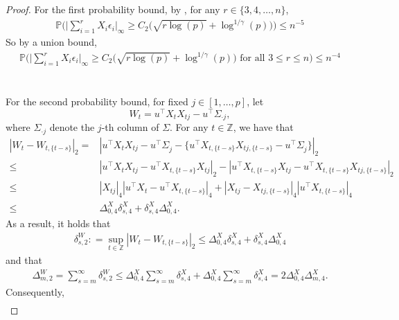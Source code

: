 \documentclass[11pt]{article}
\newcommand{\p}{\mathbb P}
\theoremstyle{plain}
\theoremstyle{definition}
\begin{document}
\begin{proof} For the first probability bound, by , for any $r\in\{3, 4, \ldots, n\}$,
\begin{align*} 
  \p\bigg(    \bigg  |   \sum_{i=1}^r X_i\epsilon_i   \bigg |_\infty \ge C_2  \bigg( \sqrt {  r \log(p )  }  +   \log ^{1/\gamma }(p )  \bigg)     \bigg)\le n^{-5} 
 \end{align*}    
So by a union bound, 
\begin{align*} 
  \p\bigg(    \bigg  |   \sum_{i=1}^r X_i\epsilon_i   \bigg |_\infty \ge C_2  \bigg( \sqrt {  r \log(p )  }  +   \log ^{1/\gamma }(p )  \bigg)   \text{ for all } 3\le r\le n  \bigg)\le n^{-4} 
 \end{align*} 
\\
\\
For the second probability bound,    for fixed $ j \in [ 1,\ldots, p]$, let
 $$ W_t  = u^\top X_t X_{t j} - u^\top \Sigma_{ \cdot j },$$
 where $\Sigma_{ \cdot j }$ denote the $j$-th column of $\Sigma$.
For any $ t\in \mathbb Z$, we have that
 \begin{align*} 
  |W_t - W _{t,\{ t-s\}}  |_2 =  &   |u^\top X_t X_{t j}  - u^\top \Sigma_{\dot j } - \big\{  u^\top X_{t, \{ t-s\}}  X_{t j, \{ t-s\} }  - u^\top \Sigma_{\dot j }     \big\}   |_2
 \\
 \le &  |u^\top X_t X_{t j}  -  u^\top X_{t, \{ t-s\}}  X_{t j  }  |_2 -   |  u^\top X_{t, \{ t-s\}}  X_{t j  }  -  u^\top X_{t, \{ t-s\}}  X_{t j, \{ t-s\} }   |_2
 \\
 \le &  |  X_{t j} |_4  | u^\top X_t   -u^\top X_{t, \{ t-s\}}    |_4 +   |   X_{t j} -X_{t j, \{ t-s\}}   |_4  | u^\top X_{t  , \{ t-s\} }    |_4
 \\
 \le & \Delta ^X_{0 ,4}  \delta^{X}_{s ,4}   + \delta^X_{s ,4}  \Delta ^{X }_{0 ,4}  .
 \end{align*}
 As a result, it holds that
\begin{align*}
  \delta_{s, 2}^W   : = \sup_{t \in \mathbb{Z}} |W_t - W _{t,\{ t-s\}}  |_2   \le \Delta ^X_{0 ,4}  \delta^{X}_{s ,4}   + \delta^X_{s ,4} \Delta ^{X}_{0 ,4}  
\end{align*}
and  that 
\begin{align*}
    \Delta_{m, 2} ^W    =    \sum_{s = m}^{\infty}\delta ^W   _{s, 2}  \le \Delta ^X_{0 ,4}   \sum_{s=m}^\infty\delta^{X}_{s ,4}  +   \Delta ^X_{0 ,4} \sum_{s=m}^\infty\delta^{X}_{s ,4}  
      =    2 \Delta ^X_{0 ,4}  \Delta ^X _{m ,4}  .
\end{align*}
Consequently, 
 \begin{align*} 

\end{align*}
\end{proof}
\end{document}

